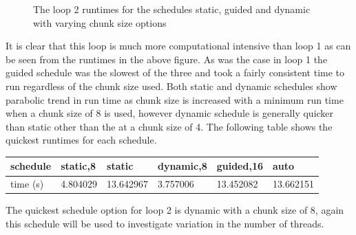 \documentclass[12pt]{article} %
\begin{document}
\begin{figure}[H] %
\caption{The loop 2 runtimes for the schedules static, guided and dynamic with varying chunk size options}
\label{fig:speciation}
\end{figure}

It is clear that this loop is much more computational intensive than loop 1 as can be seen from the runtimes in the above figure. As was the case in loop 1 the guided schedule was the slowest of the three and took a fairly consistent time to run regardless of the chunk size used. Both static and dynamic schedules show parabolic trend in run time as chunk size is increased with a minimum run time when a chunk size of 8 is used, however dynamic schedule is generally quicker than static other than the at a chunk size of 4. The following table shows the quickest runtimes for each schedule. 

\begin{center}
    \begin{tabular}{| l | l | l | l | l | l |}
    \hline
    schedule &static,8 & static &dynamic,8 & guided,16 & auto \\ \hline
    time (s) &4.804029&13.642967 & 3.757006& 13.452082& 13.662151\\ \hline
    \end{tabular}
\end{center} 

The quickest schedule option for loop 2 is dynamic with a chunk size of 8, again this schedule will be used to investigate variation in the number of threads.
\end{document}
